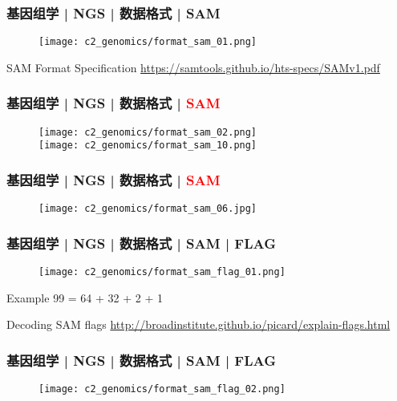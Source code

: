 \begin{frame}
  \frametitle{基因组学 | NGS | 数据格式 | SAM}
  \begin{figure}
    \centering
    \texttt{[image: c2\_genomics/format\_sam\_01.png]}
  \end{figure}
  \begin{block}{SAM Format Specification}
    \href{https://samtools.github.io/hts-specs/SAMv1.pdf}{https://samtools.github.io/hts-specs/SAMv1.pdf}
  \end{block}
\end{frame}

\begin{frame}
  \frametitle{基因组学 | NGS | 数据格式 | \textcolor{red}{SAM}}
  \begin{figure}
    \centering
    \texttt{[image: c2\_genomics/format\_sam\_02.png]}\\
    \vspace{1em}
    \texttt{[image: c2\_genomics/format\_sam\_10.png]}
  \end{figure}
\end{frame}

\begin{frame}
  \frametitle{基因组学 | NGS | 数据格式 | \textcolor{red}{SAM}}
  \begin{figure}
    \centering
    \texttt{[image: c2\_genomics/format\_sam\_06.jpg]}
  \end{figure}
\end{frame}

\begin{frame}
  \frametitle{基因组学 | NGS | 数据格式 | SAM | FLAG}
  \begin{figure}
    \centering
    \texttt{[image: c2\_genomics/format\_sam\_flag\_01.png]}
  \end{figure}
  \begin{block}{Example}
    99 = 64 + 32 + 2 + 1
  \end{block}
  \begin{block}{Decoding SAM flags}
  \href{http://broadinstitute.github.io/picard/explain-flags.html}{http://broadinstitute.github.io/picard/explain-flags.html}
  \end{block}
\end{frame}

\begin{frame}
  \frametitle{基因组学 | NGS | 数据格式 | SAM | FLAG}
  \begin{figure}
    \centering
    \texttt{[image: c2\_genomics/format\_sam\_flag\_02.png]}
  \end{figure}
\end{frame}


